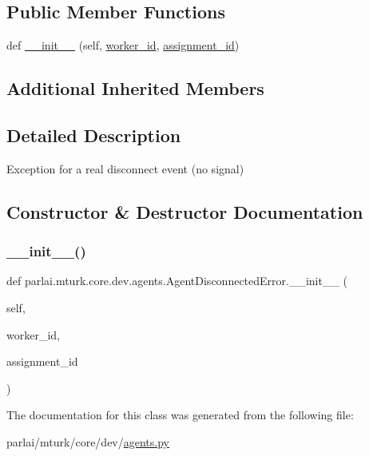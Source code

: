 \subsection*{Public Member Functions}
\begin{DoxyCompactItemize}
\item 
def \hyperlink{classparlai_1_1mturk_1_1core_1_1dev_1_1agents_1_1AgentDisconnectedError_a4a25d21dfcd5e987b5843226cfe586c1}{\+\_\+\+\_\+init\+\_\+\+\_\+} (self, \hyperlink{classparlai_1_1mturk_1_1core_1_1dev_1_1agents_1_1AbsentAgentError_a26db50c87a5d4954907d538de3da875c}{worker\+\_\+id}, \hyperlink{classparlai_1_1mturk_1_1core_1_1dev_1_1agents_1_1AbsentAgentError_ab9cf020196d28024b307c41a3fff6be1}{assignment\+\_\+id})
\end{DoxyCompactItemize}
\subsection*{Additional Inherited Members}


\subsection{Detailed Description}
\begin{DoxyVerb}Exception for a real disconnect event (no signal)
\end{DoxyVerb}
 

\subsection{Constructor \& Destructor Documentation}
\mbox{\label{classparlai_1_1mturk_1_1core_1_1dev_1_1agents_1_1AgentDisconnectedError_a4a25d21dfcd5e987b5843226cfe586c1}} 
\subsubsection{\texorpdfstring{\+\_\+\+\_\+init\+\_\+\+\_\+()}{\_\_init\_\_()}}
{\footnotesize\ttfamily def parlai.\+mturk.\+core.\+dev.\+agents.\+Agent\+Disconnected\+Error.\+\_\+\+\_\+init\+\_\+\+\_\+ (\begin{DoxyParamCaption}\item[{}]{self,  }\item[{}]{worker\+\_\+id,  }\item[{}]{assignment\+\_\+id }\end{DoxyParamCaption})}



The documentation for this class was generated from the following file\+:\begin{DoxyCompactItemize}
\item 
parlai/mturk/core/dev/\hyperlink{parlai_2mturk_2core_2dev_2agents_8py}{agents.\+py}\end{DoxyCompactItemize}
